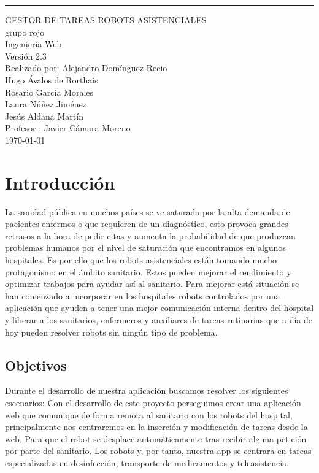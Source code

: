 \documentclass{scrreprt}
\date{}
\def\myversion{2.3}
\begin{document}
\begin{center}
    \rule{16cm}{5pt}\vskip1cm
    \begin{bfseries}
        \Huge{GESTOR DE TAREAS ROBOTS ASISTENCIALES}\\
        \vspace{1.5 cm}
        grupo rojo\\
        \vspace{1.5 cm}
        Ingeniería Web\\
        \vspace{1.5 cm}
        \LARGE{Versión \myversion}\\
        \vspace{1 cm}
        Realizado por: Alejandro Domínguez Recio \\
        Hugo Ávalos de Rorthais \\
        Rosario García Morales\\
        Laura Núñez Jiménez\\
        Jesús Aldana Martín \\
        \vspace{1 cm}
        Profesor : Javier Cámara Moreno\\
        \vspace{1 cm}
        \today\\
    \end{bfseries}
\end{center}

\tableofcontents

\chapter{Introducción}
La sanidad pública en muchos países se ve saturada por la alta demanda de pacientes enfermos o que requieren de un diagnóstico, esto provoca grandes retrasos a la hora de pedir citas y aumenta la probabilidad de que produzcan problemas humanos por el nivel de saturación que encontramos en algunos hospitales. Es por ello que los robots asistenciales están tomando mucho protagonismo en el ámbito sanitario. Estos pueden mejorar el rendimiento y optimizar trabajos para ayudar así al sanitario. Para mejorar está situación se han comenzado a incorporar en los hospitales robots controlados por una aplicación que ayuden a tener una mejor comunicación interna dentro del hospital y liberar a los sanitarios, enfermeros y auxiliares de tareas rutinarias que a día de hoy pueden resolver robots sin ningún tipo de problema. 

\section{Objetivos}
Durante el desarrollo de nuestra aplicación buscamos resolver los siguientes escenarios:
Con el desarrollo de este proyecto perseguimos crear una aplicación web que comunique de forma remota al sanitario con los robots del hospital, principalmente nos centraremos en la inserción y modificación de tareas desde la web. Para que el robot se desplace automáticamente tras recibir alguna petición por parte del sanitario. Los robots y, por tanto, nuestra app se centrara en tareas especializadas en desinfección, transporte de medicamentos y teleasistencia.
\end{document}
